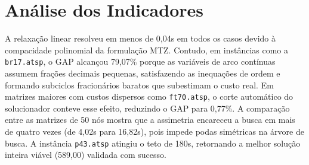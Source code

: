 \documentclass[10pt,a4paper]{article}
\begin{document}
\section{Análise dos Indicadores}
A relaxação linear resolveu em menos de 0,04s em todos os casos devido à compacidade polinomial da formulação MTZ. Contudo, em instâncias como a \texttt{br17.atsp}, o GAP alcançou 79,07\% porque as variáveis de arco contínuas assumem frações decimais pequenas, satisfazendo as inequações de ordem e formando subciclos fracionários baratos que subestimam o custo real. Em matrizes maiores com custos dispersos como \texttt{ft70.atsp}, o corte automático do solucionador conteve esse efeito, reduzindo o GAP para 0,77\%. A comparação entre as matrizes de 50 nós mostra que a assimetria encareceu a busca em mais de quatro vezes (de 4,02s para 16,82s), pois impede podas simétricas na árvore de busca. A instância \texttt{p43.atsp} atingiu o teto de 180s, retornando a melhor solução inteira viável (589,00) validada com sucesso.
\end{document}
